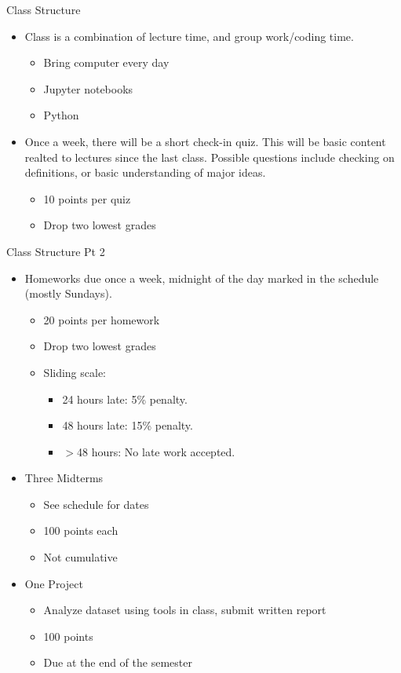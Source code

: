 \documentclass[aspectratio=169,usenames,dvipsnames]{beamer}
\begin{document}
\begin{frame}[c]{Class Structure}
\begin{itemize}
	\item Class is a combination of lecture time, and group work/coding time.
	\begin{itemize} 
		\item Bring computer every day 
		\item Jupyter notebooks
		\item Python
	\end{itemize}
	\item Once a week, there will be a short check-in quiz. This will be basic content realted to lectures since the last class. Possible questions include checking on definitions, or basic understanding of major ideas.
	\begin{itemize}
		\item 10 points per quiz
		\item Drop two lowest grades
	\end{itemize}
	
\end{itemize}
\end{frame}



\begin{frame}[c]{Class Structure Pt 2}
	\begin{itemize}
		\item Homeworks due once a week, midnight of the day marked in the schedule (mostly Sundays).
		\begin{itemize}
			\item 20 points per homework 
			\item Drop two lowest grades 
			\item Sliding scale: 
			\begin{itemize}
				\item 24 hours late: 5\% penalty.
				\item 48 hours late: 15\% penalty.
				\item $>$48 hours: No late work accepted.
			\end{itemize}
		\end{itemize}
		\item Three Midterms
		\begin{itemize}
			\item See schedule for dates 
			\item 100 points each 
			\item Not cumulative 
		\end{itemize}
		\item One Project 
		\begin{itemize}
			\item Analyze dataset using tools in class, submit written report
			\item 100 points 
			\item Due at the end of the semester
		\end{itemize}
	\end{itemize}
\end{frame}
\end{document}

